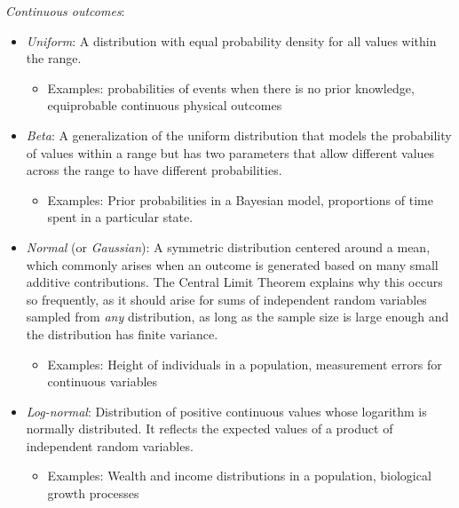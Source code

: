 \textit{Continuous outcomes}:

\begin{itemize}
\item \textit{Uniform}: A distribution with equal probability density for all values within the range.

\begin{itemize}
\item Examples: probabilities of events when there is no prior knowledge, equiprobable continuous physical outcomes
\end{itemize}


\item \textit{Beta}: A generalization of the uniform distribution that models the probability of values within a range but has two parameters that allow different values across the range to have different probabilities.

\begin{itemize}
\item Examples: Prior probabilities in a Bayesian model, proportions of time spent in a particular state.
\end{itemize}


\item \textit{Normal} (or \textit{Gaussian}): A symmetric distribution centered around a mean, which commonly arises when an outcome is generated based on many small additive contributions. The Central Limit Theorem explains why this occurs so frequently, as it should arise for sums of independent random variables sampled from \textit{any} distribution, as long as the sample size is large enough and the distribution has finite variance.

\begin{itemize}
\item Examples: Height of individuals in a population, measurement errors for continuous variables
\end{itemize}


\item \textit{Log-normal}:  Distribution of positive continuous values whose logarithm is normally distributed.  It reflects the expected values of a product of independent random variables.

\begin{itemize}
\item Examples: Wealth and income distributions in a population, biological growth processes
\end{itemize}
\end{itemize}

